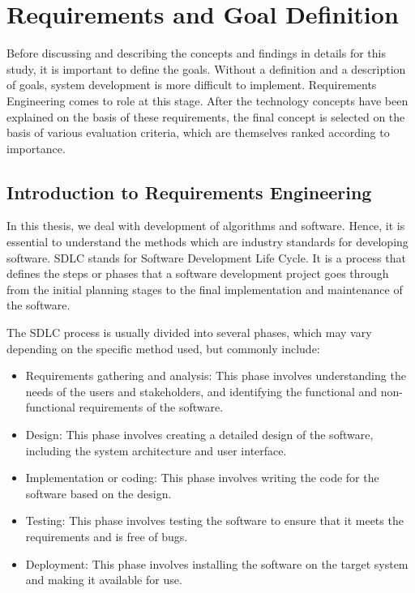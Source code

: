 \section{Requirements and Goal Definition}\label{sec:Requirements}
Before discussing and describing the concepts and findings in details for this study, it is important to define the goals. Without a definition and a description of goals, system development is more difficult to implement. Requirements Engineering comes to role at this stage. After the technology concepts have been explained on the basis of these requirements, the final concept is selected on the basis of various evaluation criteria, which are themselves ranked according to importance.

\subsection{Introduction to Requirements Engineering}
In this thesis, we deal with development of algorithms and software. Hence, it is essential to understand the methods which are industry standards for developing software. SDLC stands for Software Development Life Cycle. It is a process that defines the steps or phases that a software development project goes through from the initial planning stages to the final implementation and maintenance of the software.

The SDLC process is usually divided into several phases, which may vary depending on the specific method used, but commonly include:

\begin{itemize}
    \item Requirements gathering and analysis: This phase involves understanding the needs of the users and stakeholders, and identifying the functional and non-functional requirements of the software.
    \item Design: This phase involves creating a detailed design of the software, including the system architecture and user interface.
    \item Implementation or coding: This phase involves writing the code for the software based on the design.
    \item Testing: This phase involves testing the software to ensure that it meets the requirements and is free of bugs.
    \item Deployment: This phase involves installing the software on the target system and making it available for use.
\end{itemize}


